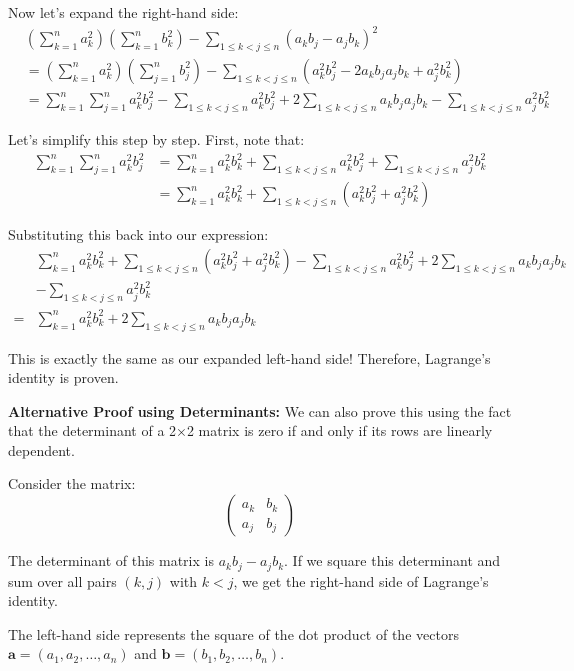 Now let's expand the right-hand side:
\begin{align*}
&\left( \sum_{k=1}^n a_k^2 \right)\left( \sum_{k=1}^n b_k^2 \right) - \sum_{1 \leq k < j \leq n} (a_k b_j - a_j b_k)^2 \\
&= \left( \sum_{k=1}^n a_k^2 \right)\left( \sum_{j=1}^n b_j^2 \right) - \sum_{1 \leq k < j \leq n} (a_k^2 b_j^2 - 2a_k b_j a_j b_k + a_j^2 b_k^2) \\
&= \sum_{k=1}^n \sum_{j=1}^n a_k^2 b_j^2 - \sum_{1 \leq k < j \leq n} a_k^2 b_j^2 + 2 \sum_{1 \leq k < j \leq n} a_k b_j a_j b_k - \sum_{1 \leq k < j \leq n} a_j^2 b_k^2
\end{align*}

Let's simplify this step by step. First, note that:
\begin{align*}
\sum_{k=1}^n \sum_{j=1}^n a_k^2 b_j^2 &= \sum_{k=1}^n a_k^2 b_k^2 + \sum_{1 \leq k < j \leq n} a_k^2 b_j^2 + \sum_{1 \leq k < j \leq n} a_j^2 b_k^2 \\
&= \sum_{k=1}^n a_k^2 b_k^2 + \sum_{1 \leq k < j \leq n} (a_k^2 b_j^2 + a_j^2 b_k^2)
\end{align*}

Substituting this back into our expression:
\begin{align*}
&\sum_{k=1}^n a_k^2 b_k^2 + \sum_{1 \leq k < j \leq n} (a_k^2 b_j^2 + a_j^2 b_k^2) - \sum_{1 \leq k < j \leq n} a_k^2 b_j^2 + 2 \sum_{1 \leq k < j \leq n} a_k b_j a_j b_k  \\
&- \sum_{1 \leq k < j \leq n} a_j^2 b_k^2 \\
=& \sum_{k=1}^n a_k^2 b_k^2 + 2 \sum_{1 \leq k < j \leq n} a_k b_j a_j b_k
\end{align*}

This is exactly the same as our expanded left-hand side! Therefore, Lagrange's identity is proven.

\textbf{Alternative Proof using Determinants:}
We can also prove this using the fact that the determinant of a 2×2 matrix is zero if and only if its rows are linearly dependent.

Consider the matrix:
\[
\begin{pmatrix}
a_k & b_k \\
a_j & b_j
\end{pmatrix}
\]

The determinant of this matrix is $a_k b_j - a_j b_k$. If we square this determinant and sum over all pairs $(k,j)$ with $k < j$, we get the right-hand side of Lagrange's identity.

The left-hand side represents the square of the dot product of the vectors $\mathbf{a} = (a_1, a_2, \ldots, a_n)$ and $\mathbf{b} = (b_1, b_2, \ldots, b_n)$.

